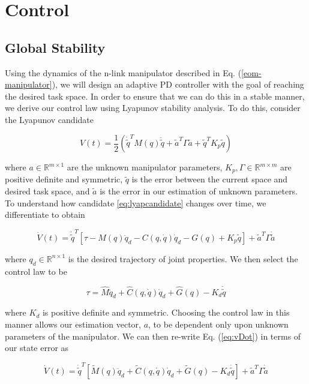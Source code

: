 \section{Control}
\subsection{Global Stability}
Using the dynamics of the n-link manipulator described in Eq.
(\ref{eom-manipulator}), we will design an adaptive PD controller with the goal
of reaching the desired task space.
In order to ensure that we can do this in a stable manner, we derive our control
law using Lyapunov stability analysis. To do this, consider the Lyapunov
candidate

\begin{equation}
  V(t) = \frac{1}{2}\left(\dot{\tilde{q}}^{T}M(q)\ddot{\tilde{q}} + \tilde{a}^{T}\Gamma\tilde{a} + \tilde{q}^{T}K_{p}\tilde{q}\right)
  \label{eq:lyapcandidate}
\end{equation}

where $a\in\mathbb{R}^{m\times1}$ are the unknown manipulator parameters,
$K_{p}, \Gamma\in\mathbb{R}^{m\times m}$ are positive definite and symmetric,
$\tilde{q}$ is the error between the current space and desired task space, and
$\tilde{a}$ is the error in our estimation of unknown parameters.
To understand how candidate \ref{eq:lyapcandidate} changes over time, we
differentiate to obtain

\begin{equation}
  \dot{V}(t) = \dot{\tilde{q}}^{T}\left[ \tau - M(q)\ddot{q}_{d} - C(q,\dot{q})\dot{q}_{d} - G(q) + K_{p}\tilde{q} \right] + \tilde{a}^{T}\Gamma\dot{\tilde{a}}
  \label{eq:vDot}
\end{equation}

where $q_{d}\in\mathbb{R}^{n\times1}$ is the desired trajectory of joint
properties.
We then select the control law to be

\begin{equation}
  \tau = \hat{M}\ddot{q}_{d} + \hat{C}(q,\dot{q})\dot{q}_{d} + \hat{G}(q)	- K_{d}\dot{\tilde{q}}
  \label{eq:controlLaw}
\end{equation}

where $K_{d}$ is positive definite and symmetric.
Choosing the control law in this manner allows our estimation vector, $a$, to be
dependent only upon unknown parameters of the manipulator.
We can then re-write Eq. (\ref{eq:vDot}) in terms of our state error as

\begin{equation}
  \dot{V}(t) = \dot{\tilde{q}}^{T}\left[ \tilde{M}(q)\ddot{q}_{d} + \tilde{C}(q,\dot{q})\dot{q}_{d} + \tilde{G}(q) - K_{d}\dot{\tilde{q}} \right] + \tilde{a}^{T}\Gamma\dot{\tilde{a}}
  \label{eq:vDotControl}
\end{equation}

